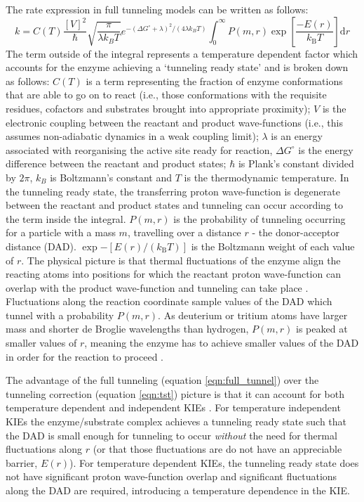 The rate expression in full tunneling models \cite{knappTemperatureDependentIsotopeEffects2002, kohenRoleDynamicsEnzyme2015} can be written as follows: 
\begin{equation}\label{eqn:full_tunnel}
k = C(T)\frac{[V]^{2}}{\hbar} \sqrt{\frac{\pi}{\lambda k_{B}T}} e^{-(\Delta G^{\circ} + \lambda)^{2}/(4\lambda k_{B}T)} \int_{0}^{\infty} P(m,r) \exp \left[\frac{-E(r) }{k_{\mathrm{B}} T}\right] \mathrm{d}r
\end{equation}
The term outside of the integral represents a temperature dependent factor which accounts for the enzyme achieving a `tunneling ready state' and is broken down as follows: $C(T)$ is a term representing the fraction of enzyme conformations that are able to go on to react (i.e., those conformations with the requisite residues, cofactors and substrates brought into appropriate proximity); $V$ is the electronic coupling between the reactant and product wave-functions (i.e., this assumes non-adiabatic dynamics in a weak coupling limit);  $\lambda$ is an energy associated with reorganising the active site ready for reaction, $\Delta G^{\circ}$ is  the energy difference between the reactant and product states; $\hbar$ is Plank's constant divided by $2\pi$, $k_{B}$ is Boltzmann's constant and $T$ is the thermodynamic temperature.  In the tunneling ready state, the transferring proton  wave-function is degenerate between the reactant and product states and tunneling can occur according to the term inside the integral.  $P(m, r)$ is the probability of tunneling occurring for a particle with a mass $m$, travelling over a distance $r$ - the donor-acceptor distance (DAD).  $\exp{-\left[E(r) /\left(k_{\mathrm{B}} T\right)\right]}$ is the Boltzmann weight of each value of $r$. The physical picture is that thermal fluctuations of the enzyme align the reacting atoms into positions for which the reactant proton wave-function can overlap with the product wave-function and tunneling can take place \cite{klinmanHydrogenTunnelingLinks2013, kohenRoleDynamicsEnzyme2015}. Fluctuations along the reaction coordinate sample values of the DAD which tunnel with a probability $P(m,r)$. As deuterium or tritium atoms have larger mass and shorter de Broglie wavelengths than hydrogen,  $P(m,r)$ is peaked at smaller values of $r$, meaning the enzyme has to achieve smaller values of the DAD in order for the reaction to proceed \cite{klinmanHydrogenTunnelingLinks2013, kohenRoleDynamicsEnzyme2015}. 

The advantage of the full tunneling (equation \ref{eqn:full_tunnel}) over the tunneling correction (equation \ref{eqn:tst}) picture is that it can account for both temperature dependent and independent KIEs \cite{klinmanbeyond2009, klinmanHydrogenTunnelingLinks2013}. For temperature independent KIEs the enzyme/substrate complex achieves a tunneling ready state such that the DAD is small enough for tunneling to occur \emph{without} the need for thermal fluctuations along $r$ (or that those fluctuations are do not have an appreciable barrier, $E(r)$).  For temperature dependent KIEs, the tunneling ready state does not have significant proton wave-function overlap and significant fluctuations along the DAD are required, introducing a temperature dependence in the KIE.  

